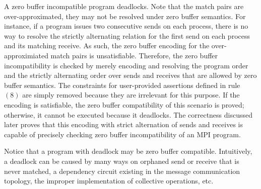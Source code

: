 \encodingzb


A zero buffer incompatible program deadlocks.
Note that the match pairs are over-approximated, they may not be resolved under zero buffer semantics. For instance, if a program issues two consecutive sends on each process, there is no way to resolve the strictly alternating relation for the first send on each process and its matching receive. As such, the zero buffer encoding for the over-approximiated match pairs is unsatisfiable.
Therefore, the zero buffer incompatibility is checked by merely encoding and resolving the program order and the strictly alternating order over sends and receives that are allowed by zero buffer semantics. The constraints for user-provided assertions defined in rule $(8)$ are simply removed because they are irrelevant for this purpose. If the encoding is satisfiable, the zero buffer compatibility of this scenario is proved; otherwise, it cannot be executed because it deadlocks. The correctness discussed later proves that this encoding with strict alternation of sends and receives is capable of precisely checking zero buffer incompatibility of an MPI program.

Notice that a program with deadlock may be zero buffer compatible. Intuitively, a deadlock can be caused by many ways on orphaned send or receive that is never matched, a dependency circuit existing in the message communication topology, the improper implementation of collective operations, etc. 


